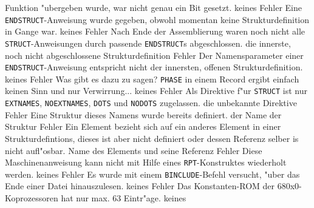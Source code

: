 \documentclass[12pt,a4paper,twoside]{report}
\newcommand{\tty}[1]{{\tt #1}}
\begin{document}
\begin{description}
{                Funktion "ubergeben wurde, war nicht genau ein Bit
                gesetzt.}
               {keines}
               {Fehler}
               {Eine \tty{ENDSTRUCT}-Anweisung wurde gegeben, obwohl
                momentan keine Strukturdefinition in Gange war.}
               {keines}
               {Fehler}
               {Nach Ende der Assemblierung waren noch nicht alle
                \tty{STRUCT}-Anweisungen durch passende \tty{ENDSTRUCT}s
                abgeschlossen.}
               {die innerste, noch nicht abgeschlossene
                Strukturdefinition}
               {Fehler}
               {Der Namensparameter einer \tty{ENDSTRUCT}-Anweisung
                entspricht nicht der innersten, offenen
                Strukturdefinition.}
               {keines}
               {Fehler}
               {Was gibt es dazu zu sagen?  \tty{PHASE} in einem Record
                ergibt einfach keinen Sinn und nur Verwirrung...}
               {keines}
\errentry{1554}{ung"ultige \tty{STRUCT}-Direktive}
               {Fehler}
               {Als Direktive f"ur \tty{STRUCT} ist nur
                \tty{EXTNAMES}, \tty{NOEXTNAMES}, \tty{DOTS} und
                \tty{NODOTS} zugelassen.}
               {die unbekannte Direktive}
               {Fehler}
               {Eine Struktur dieses Namens wurde bereits definiert.}
               {der Name der Struktur}
               {Fehler}
               {Ein Element bezieht sich auf ein anderes Element in
                einer Strukturdefintions, dieses ist aber nicht
                definiert oder dessen Referenz selber is nicht
                aufl"osbar.}
               {Name des Elements und seine Referenz}
               {Fehler}
               {Diese Maschinenanweisung kann nicht mit Hilfe eines
                {\tt RPT}-Konstruktes wiederholt werden.}
               {keines}
               {Fehler}
               {Es wurde mit einem \tty{BINCLUDE}-Befehl versucht,
                "uber das Ende einer Datei hinauszulesen.}
               {keines}
               {Fehler}
               {Das Konstanten-ROM der 680x0-Koprozessoren hat
                nur max. 63 Eintr"age.}
               {keines}

\end{description}
\end{document}
